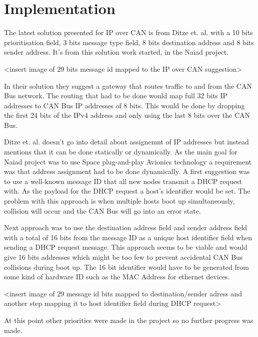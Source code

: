 \section{Implementation}\label{sec:implementation}
The latest solution presented for IP over CAN is from Ditze et. al. with a 10
bits prioritisation field, 3 bits message type field, 8 bits destination
address and 8 bits sender address. It's from this solution work started, in the
Naiad project.

<insert image of 29 bits message id mapped to the IP over CAN suggestion>

In their solution they suggest a gateway that routes traffic to and from the
CAN Bus network. The routing that had to be done would map full 32 bits IP
addresses to CAN Bus IP addresses of 8 bits. This would be done by dropping the
first 24 bits of the IPv4 address and only using the last 8 bits over the CAN
Bus.

Ditze et. al. doesn't go into
detail about assignemnt of IP addresses
but instead mentions that it can be done statically or dynamically. As the main
goal for Naiad project was to use Space plug-and-play Avionics
technology a requirement was that address assignment had to be done
dynamically. A first suggestion was to use a well-known message ID that all new
nodes transmit a DHCP request with. As the payload for the DHCP request a
host's identifier would be set.
The problem with this approach is when multiple hosts boot up
simultaneously, collision will occur and the CAN Bus will go into an error
state.

Next approach was to use the destination address field and sender address field
with a total of 16 bits from the message ID as a unique host identifier field
when sending a DHCP request message. This approach seems to be viable and would
give 16 bits addresses which might be too few to prevent accidental CAN Bus
collisions during boot up. The 16 bit identifier would have to be generated
from some kind of hardware ID such as the MAC Address for ethernet devices.

<insert image of 29 message id bits mapped to destination/sender adress and
another step mapping it to host identifier field during DHCP request>

At this point other priorities were made in the project so no further progress
was made.
